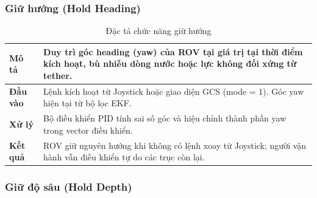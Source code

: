 \documentclass[../DoAn.tex]{subfiles}
\begin{document}
\subsubsection{Giữ hướng (Hold Heading)}

\begin{table}[H]

\centering

\renewcommand{\arraystretch}{1.3}

\begin{tabular}{|l|p{9cm}|}

\hline

\textbf{Mô tả} &
Duy trì góc heading (yaw) của ROV tại giá trị tại thời điểm
kích hoạt, bù nhiễu dòng nước hoặc lực không đối xứng từ
tether. \\

\hline

\textbf{Đầu vào} &
Lệnh kích hoạt từ Joystick hoặc giao diện GCS (mode = 1).
Góc yaw hiện tại từ bộ lọc EKF. \\

\hline

\textbf{Xử lý} &
Bộ điều khiển PID tính sai số góc và hiệu chỉnh thành phần
yaw trong vector điều khiển. \\

\hline

\textbf{Kết quả} &
ROV giữ nguyên hướng khi không có lệnh xoay từ Joystick;
người vận hành vẫn điều khiển tự do các trục còn lại. \\

\hline

\end{tabular}

\caption{Đặc tả chức năng giữ hướng}

\label{tab:hold_heading}

\end{table}

\subsubsection{Giữ độ sâu (Hold Depth)}
\end{document}
